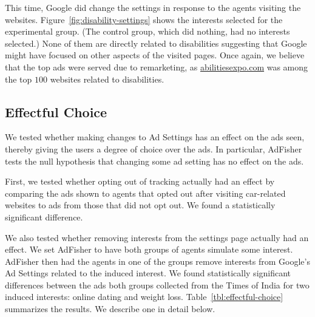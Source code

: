 \documentclass{article}
\begin{document}
This time, Google did change the settings in response to the agents visiting the websites.
Figure~\ref{fig:disability-settings} shows the interests selected for the experimental group.  (The control group, which did nothing, had no interests selected.)
None of them are directly related to disabilities suggesting that Google might have focused on other aspects of the visited pages.  Once again, we believe that the top ads were served due to remarketing, as \url{abilitiesexpo.com} was among the top $100$ websites related to disabilities. 






















\subsection{Effectful Choice}

We tested whether making changes to Ad Settings has an effect on the ads seen, thereby giving the users a degree of choice over the ads.  In particular, AdFisher tests the null hypothesis that changing some ad setting has no effect on the ads.

First, we tested whether opting out of tracking actually had an effect by comparing the ads shown to agents that opted out after visiting car-related websites to ads from those that did not opt out.
We found a statistically significant difference.

We also tested whether removing interests from the settings page actually had an effect.
We set AdFisher to have both groups of agents simulate some interest. 
AdFisher then had the agents in one of the groups remove interests from Google's Ad Settings related to the induced interest.
We found statistically significant differences between the ads both groups collected from the Times of India for two induced interests: online dating and weight loss.  
Table~\ref{tbl:effectful-choice} summarizes the results.
We describe one in detail below.
\end{document}

